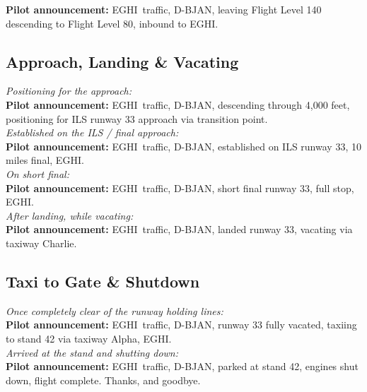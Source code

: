 \documentclass{article}
\newcommand{\callsign}{D-BJAN}
\newcommand{\destination}{EGHI}
\begin{document}
\textbf{Pilot announcement:} \destination~traffic, \callsign, leaving Flight Level 140 descending to Flight Level 80, inbound to \destination.

\subsection*{Approach, Landing \& Vacating}

\textit{Positioning for the approach:} \\

\textbf{Pilot announcement:} \destination~traffic, \callsign, descending through 4,000 feet, positioning for ILS runway 33 approach via transition point. \\

\textit{Established on the ILS / final approach:} \\

\textbf{Pilot announcement:} \destination~traffic, \callsign, established on ILS runway 33, 10 miles final, \destination. \\

\textit{On short final:} \\

\textbf{Pilot announcement:} \destination~traffic, \callsign, short final runway 33, full stop, \destination. \\

\textit{After landing, while vacating:} \\

\textbf{Pilot announcement:} \destination~traffic, \callsign, landed runway 33, vacating via taxiway Charlie.

\subsection*{Taxi to Gate \& Shutdown}

\textit{Once completely clear of the runway holding lines:} \\

\textbf{Pilot announcement:} \destination~traffic, \callsign, runway 33 fully vacated, taxiing to stand 42 via taxiway Alpha, \destination. \\

\textit{Arrived at the stand and shutting down:} \\

\textbf{Pilot announcement:} \destination~traffic, \callsign, parked at stand 42, engines shut down, flight complete. Thanks, and goodbye.
\end{document}
